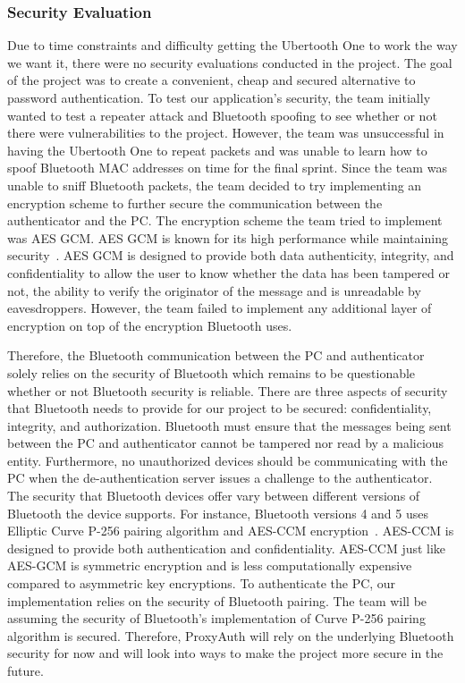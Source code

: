\documentclass[letterpaper,twocolumn,10pt]{article}
\begin{document}
{{\subsubsection{Security Evaluation}
Due to time constraints and difficulty getting the Ubertooth One to work the way we want it, there were no security evaluations conducted in the project. The goal of the project was to create a convenient, cheap and secured alternative to password authentication. To test our application's security, the team initially wanted to test a repeater attack and Bluetooth spoofing to see whether or not there were vulnerabilities to the project. However, the team was unsuccessful in having the Ubertooth One to repeat packets and was unable to learn how to spoof Bluetooth MAC addresses on time for the final sprint. Since the team was unable to sniff Bluetooth packets, the team decided to try implementing an encryption scheme to further secure the communication between the authenticator and the PC. The encryption scheme the team tried to implement was AES GCM. AES GCM is known for its high performance while maintaining security~\cite{aes-gcm}. AES GCM is designed to provide both data authenticity, integrity, and confidentiality to allow the user to know whether the data has been tampered or not, the ability to verify the originator of the message and is unreadable by eavesdroppers. However, the team failed to implement any additional layer of encryption on top of the encryption Bluetooth uses.

Therefore, the Bluetooth communication between the PC and authenticator solely relies on the security of Bluetooth which remains to be questionable whether or not Bluetooth security is reliable. There are three aspects of security that Bluetooth needs to provide for our project to be secured: confidentiality, integrity, and authorization. Bluetooth must ensure that the messages being sent between the PC and authenticator cannot be tampered nor read by a malicious entity. Furthermore, no unauthorized devices should be communicating with the PC when the de-authentication server issues a challenge to the authenticator. The security that Bluetooth devices offer vary between different versions of Bluetooth the device supports. For instance, Bluetooth versions 4 and 5 uses Elliptic Curve P-256 pairing algorithm and AES-CCM encryption~\cite{bluetooth_security}. AES-CCM is designed to provide both authentication and confidentiality. AES-CCM just like AES-GCM is symmetric encryption and is less computationally expensive compared to asymmetric key encryptions. To authenticate the PC, our implementation relies on the security of Bluetooth pairing. The team will be assuming the security of Bluetooth's implementation of Curve P-256 pairing algorithm is secured. Therefore, ProxyAuth will rely on the underlying Bluetooth security for now and will look into ways to make the project more secure in the future.

}}
\end{document}
